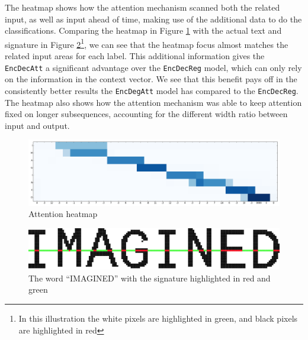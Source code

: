 The heatmap shows how the attention mechanism scanned both the related input, as well as input ahead of time, making use of the additional data to do the classifications. Comparing the heatmap in Figure \ref{fig:attention_heatmap} with the actual text and signature in Figure  \ref{fig:imagine_highlighted}\footnote{In this illustration the white pixels are highlighted in green, and black pixels are highlighted in red}, we can see that the heatmap focus almost matches the related input areas for each label. This additional information gives the {\tt EncDecAtt} a significant advantage over the {\tt EncDecReg} model, which can only rely on the information in the context vector. We see that this benefit pays off in the consistently better results the {\tt EncDegAtt} model has compared to the {\tt EncDecReg}. The heatmap also shows how the attention mechanism was able to keep attention fixed on longer subsequences, accounting for the different width ratio between input and output.

\begin{figure}[ht]
    \centering
    \includegraphics[width=1\textwidth]{fig/conclusion/attention_crop.png}
    \caption{Attention heatmap}
    \label{fig:attention_heatmap}
\end{figure}

\begin{figure}[ht]
    \centering
    \includegraphics[width=1\textwidth]{fig/conclusion/imagined_grid_exported.jpg}
    \caption{The word ``IMAGINED'' with the signature highlighted in red and green}
    \label{fig:imagine_highlighted}
\end{figure}
